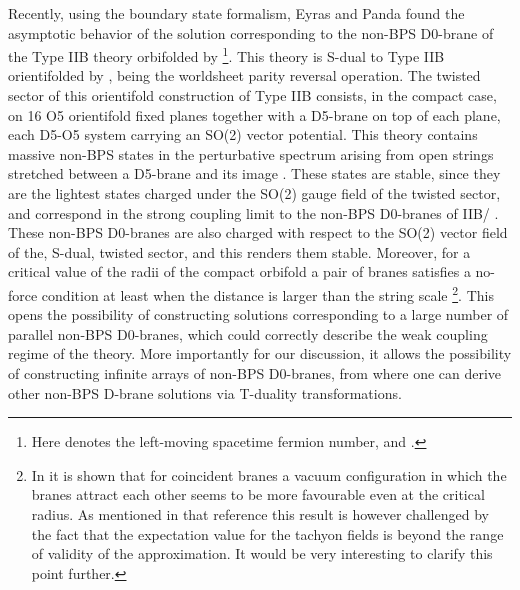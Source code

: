 \documentclass[12pt,a4paper]{article}
\begin{document}
Recently, using the boundary state formalism, Eyras and Panda \cite{EP}
found the asymptotic behavior of the solution corresponding to the
non-BPS D0-brane of the Type IIB theory orbifolded by
\coordHE{} \cite{Sen2,BG}\footnote{Here \coordHE{} denotes the left-moving
spacetime fermion number, and \coordHE{}.}.
This theory is S-dual to Type IIB orientifolded by
\coordHE{}, \myHighlight{$\Omega$}\coordHE{} being the worldsheet
parity reversal operation. The twisted sector of this orientifold
construction of Type IIB consists, in the compact case, on 16 O5 orientifold
fixed planes together with a D5-brane on top of each 
plane, each D5-O5 system carrying an SO(2)
vector potential. This theory contains
massive non-BPS states in the perturbative spectrum arising from
open strings stretched between a D5-brane and its image \cite{Sen*}. 
These states are stable, since they are the lightest states
charged under the SO(2) gauge
field of the twisted sector, and correspond in the strong coupling limit 
to the non-BPS D0-branes of IIB/\coordHE{} \cite{Sen2,BG}.
These non-BPS D0-branes are also charged with respect to the
SO(2) vector field of the, S-dual, twisted sector, and this renders 
them stable.
Moreover, for a critical value of the radii of the compact orbifold
a pair of branes satisfies a no-force condition at least when the
distance is larger than the string scale 
\cite{GS,MOT}\footnote{In \cite{LS} it is shown that for coincident
branes a vacuum configuration in which the branes attract each other
seems to be more favourable even at the critical radius.
As mentioned in that reference
this result is however challenged by the fact that 
the expectation value for the tachyon fields is beyond the range 
of validity of the approximation. It would be very interesting
to clarify this point further.}. 
This opens the possibility of constructing solutions 
corresponding to a large number of parallel non-BPS D0-branes, 
which could correctly describe
the weak coupling regime of the theory. More importantly for our
discussion, it allows the possibility of constructing 
infinite arrays of non-BPS
D0-branes, from where one can derive other non-BPS D-brane
solutions via T-duality transformations.
\end{document}
